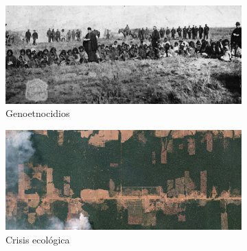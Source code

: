 \documentclass[a4paper,10pt]{book}
\newif\ifes
\newcommand{\es}[1]{\ifes#1\fi}
\begin{document}
\es{Con las guerras del opio, en 1839, se establece finalmente la hegemonía de Europa occidenta.}%
%
\es{A partir de entonces comienza un avance sin precedentes de Europa sobre los pueblos de todo el mundo.}%
%
\es{Es una nueva era de avances científicos y tecnológicos, pero por otro es la era de los genocidios y de la pérdida de la diversidad cultural.}%
%
\es{Comienza la colonización de África continental en 1850.}%
%
\es{En América Latina se producen los mayores genocidios y ocupación de territorios, que todavía seguían a manos de comunidades locales.}%
%
\begin{figure}[ht!]
    \centering
    \begin{subfigure}[b]{0.48\textwidth}
    \includegraphics[width=\linewidth]{static/genocidio_patagonia}
    \caption{Genoetnocidios}
    \label{fig:genocidio_patagonia}
    \end{subfigure}
    \begin{subfigure}[b]{0.47\textwidth}
    \includegraphics[width=\linewidth]{static/deforestation-brazil}
    \caption{Crisis ecológica}
    \label{fig:deforestation-brazil}
    \end{subfigure}
    \caption{
    }
    \label{fig:cultural-lose}
\end{figure}
\es{En todas las partes del globo, los etnógrafos fueron documentando la perdida de cultural debida al avance del frente colonial-moderno, estatal o privado, sobre las autonomías locales.}%
\end{document}
